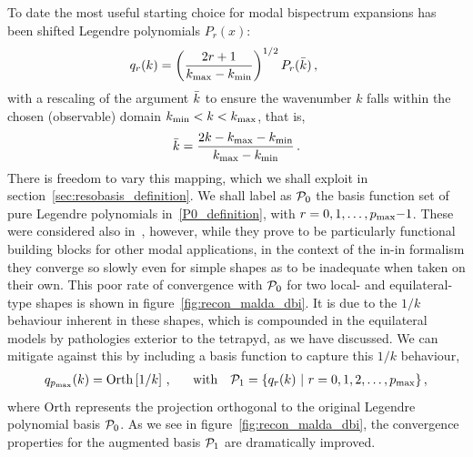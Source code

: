 To date the most useful starting choice for modal bispectrum expansions has been shifted Legendre polynomials $P_r(x)$:
\begin{align}\label{P0_definition}
    q_{r}(k) = \left(\frac{2r+1} {{k_\text{max}} - {k_\text{min}}}\right)^{1/2} P_r(\bar{k})\,,\qquad 
\end{align}
with a rescaling of the argument $\bar{k}$ to ensure the wavenumber $k$ falls within the chosen (observable) domain ${k_\text{min}}< k<{k_\text{max}}$, that is, 
\begin{align}\label{krescaled}
    \bar{k}=\frac{2k-{k_\text{max}}-{k_\text{min}}}{{k_\text{max}}-{k_\text{min}}}\,.
\end{align}
There is freedom to vary this mapping, which we shall exploit in section~\ref{sec:resobasis_definition}.
We shall label as $\mathcal{P}_0$ the basis function set of pure Legendre polynomials in~\eqref{P0_definition},
with $r=0,1,\dots, p_{\rm max}\text{$-$}1$.
These were considered also in~\cite{Funakoshi}, however,
while they prove to be particularly functional building blocks for other modal applications,
in the context of the in-in formalism
they converge so slowly even for simple shapes as to be inadequate when taken on their own.
This poor rate of convergence with $\mathcal{P}_0$ for two local- and equilateral-type shapes is shown in figure~\ref{fig:recon_malda_dbi}.
It is due to the $1/k$ behaviour inherent in these shapes,
which is compounded in the equilateral models by pathologies exterior to the tetrapyd,
as we have discussed.
We can mitigate against this by including a basis function to capture this $1/k$ behaviour, 
\begin{align}\label{P1_definition}
    q_{p_{\rm max}}(k) = \text{Orth}\left[{1}/ {k}\right]\,, ~~ \quad \text{with} \quad  \mathcal{P}_1 = \{ q_r(k) ~\vert~ r= 0, 1,2, \dots , p_{\rm max}\}\,,
\end{align}
where $\text{Orth}$ represents the projection orthogonal to the original Legendre polynomial basis $\mathcal{P}_0$.
As we see in figure~\ref{fig:recon_malda_dbi}, the convergence properties for the augmented basis  $\mathcal{P}_1$ are dramatically improved.

